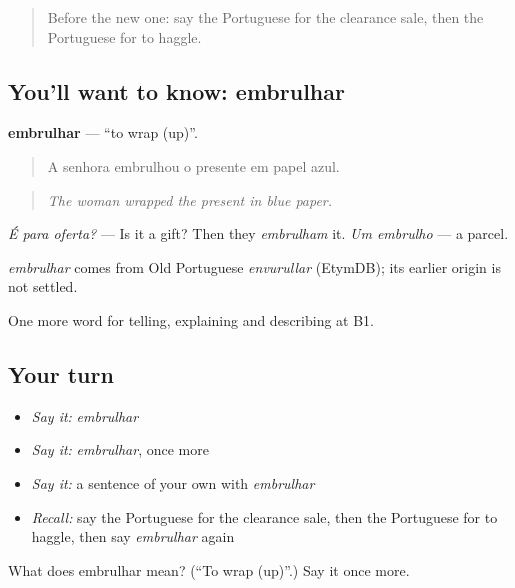 \label{lesson:PT-C453-embrulhar}



\begin{quote}
Before the new one: say the Portuguese for the clearance sale, then the Portuguese for to haggle.
\end{quote}

\subsection*{You'll want to know: embrulhar}
\textbf{embrulhar} — \textquotedblleft{}to wrap (up)\textquotedblright{}.

\begin{quote}
A senhora embrulhou o presente em papel azul.
\end{quote}

\begin{quote}
\emph{The woman wrapped the present in blue paper.}
\end{quote}

\emph{É para oferta?} — Is it a gift? Then they \emph{embrulham} it. \emph{Um embrulho} — a parcel.

\begin{cousinweb}
\emph{embrulhar} comes from Old Portuguese \emph{envurullar} (EtymDB); its earlier origin is not settled.
\end{cousinweb}

\begin{grammarlens}[title={What you've built}]
One more word for telling, explaining and describing at B1.
\end{grammarlens}

\subsection*{Your turn}
\begin{itemize}
\raggedright
  \item \emph{Say it:} \emph{embrulhar}
  \item \emph{Say it:} \emph{embrulhar}, once more
  \item \emph{Say it:} a sentence of your own with \emph{embrulhar}
  \item \emph{Recall:} say the Portuguese for the clearance sale, then the Portuguese for to haggle, then say \emph{embrulhar} again
\end{itemize}

\begin{tcolorbox}[breakable,colback=teal!4,colframe=teal!35!black,title={Before you move on}]
What does embrulhar mean? (\textquotedblleft{}To wrap (up)\textquotedblright{}.) Say it once more.
\end{tcolorbox}
